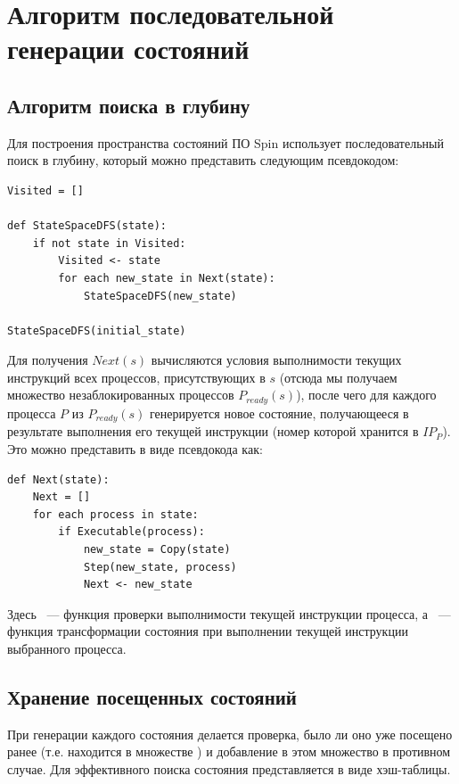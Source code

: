 \chapter{Алгоритм последовательной генерации состояний}
\label{sec:seq-statespace}

\section{Алгоритм поиска в глубину}
\label{sec:seq-algo}

Для построения пространства состояний ПО Spin использует последовательный поиск в
глубину, который можно представить следующим псевдокодом:

\begin{lstlisting}[style=pseudocode]
Visited = []

def StateSpaceDFS(state):
    if not state in Visited:
        Visited <- state
        for each new_state in Next(state):
            StateSpaceDFS(new_state)

StateSpaceDFS(initial_state)
\end{lstlisting}

Для получения $Next(s)$ вычисляются условия выполнимости текущих инструкций всех
процессов, присутствующих в $s$ (отсюда мы получаем множество незаблокированных процессов
$P_{ready}(s)$), после чего для каждого процесса $P$ из $P_{ready}(s)$ генерируется новое
состояние, получающееся в результате выполнения его текущей инструкции (номер которой
хранится в $IP_P$). Это можно представить в виде псевдокода как:

\begin{lstlisting}[style=pseudocode]
def Next(state):
    Next = []
    for each process in state:
        if Executable(process):
            new_state = Copy(state)
            Step(new_state, process)
            Next <- new_state
\end{lstlisting}

Здесь ~--- функция проверки выполнимости текущей инструкции процесса, а
~--- функция трансформации состояния при выполнении текущей инструкции
выбранного процесса.

\section{Хранение посещенных состояний}
\label{sec:state-hashing}

При генерации каждого состояния делается проверка, было ли оно уже посещено ранее
(т.е. находится в множестве ) и добавление в этом множество в противном
случае. Для эффективного поиска состояния  представляется в виде
хэш-таблицы.

